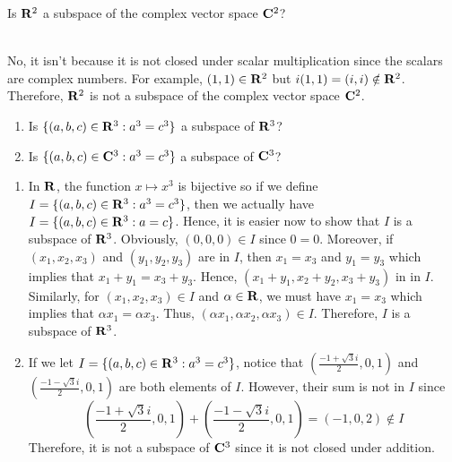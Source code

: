 \begin{exercise}
    Is $\mathbf{R}^2$ a subspace of the complex vector space $\mathbf{C}^2$?\\
\end{exercise}

\begin{solution}
    \\ No, it isn't because it is not closed under scalar multiplication since the scalars are complex numbers. For example, $(1,1) \in \mathbf{R}^2$ but $i(1,1) = (i,i) \notin \mathbf{R}^2$. Therefore, $\mathbf{R}^2$ is not a subspace of the complex vector space $\mathbf{C}^2$.\\
\end{solution}

\begin{exercise}
    \begin{enumerate}[label=(\alph*)]
        \item Is $\{(a,b,c) \in \mathbf{R}^3 : a^3 = c^3\}$ a subspace of $\mathbf{R}^3$? \\
        \item Is $\{(a,b,c) \in \mathbf{C}^3 : a^3 = c^3\}$ a subspace of $\mathbf{C}^3$? \\
    \end{enumerate}
\end{exercise}

\begin{solution}
    \begin{enumerate}[label=(\alph*)]
        \item In $\mathbf{R}$, the function $x \mapsto x^3$ is bijective so if we define $I = \{(a,b,c) \in \mathbf{R}^3 : a^3 = c^3\}$, then we actually have $I = \{(a,b,c) \in \mathbf{R}^3 : a = c\}$. Hence, it is easier now to show that $I$ is a subspace of $\mathbf{R}^3$. Obviously, $(0,0,0) \in I$ since $0 = 0$. Moreover, if $(x_1,x_2,x_3)$ and $(y_1, y_2, y_3)$ are in $I$, then $x_1 = x_3$ and $y_1 = y_3$ which implies that $x_1 + y_1 = x_3 + y_3$. Hence, $(x_1 + y_1, x_2 + y_2, x_3 + y_3)$ in in $I$. Similarly, for $(x_1, x_2, x_3) \in I$ and $\alpha \in \mathbf{R}$, we must have $x_1 = x_3$ which implies that $\alpha x_1 = \alpha x_3$. Thus, $(\alpha x_1, \alpha x_2, \alpha x_3) \in I$. Therefore, $I$ is a subspace of $\mathbf{R}^3$.
        \item If we let $I = \{(a,b,c) \in \mathbf{R}^3 : a^3 = c^3\}$, notice that $(\frac{-1+\sqrt{3}i}{2}, 0, 1)$ and $(\frac{-1-\sqrt{3}i}{2}, 0, 1)$ are both elements of $I$. However, their sum is not in $I$ since
        $$\left( \frac{-1+\sqrt{3}i}{2}, 0, 1 \right) + \left( \frac{-1-\sqrt{3}i}{2}, 0, 1 \right) = (-1, 0, 2) \notin I$$
        Therefore, it is not a subspace of $\mathbf{C}^3$ since it is not closed under addition. \\
    \end{enumerate}
\end{solution}

